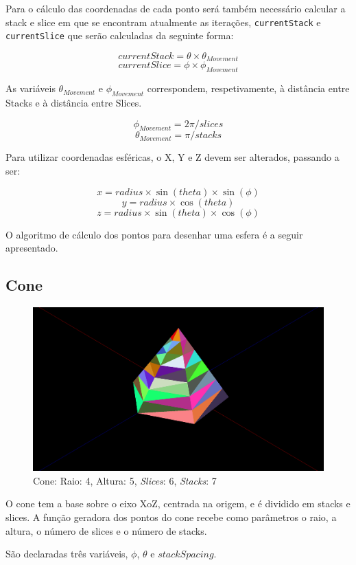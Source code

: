 \documentclass[a4paper]{article}
\newcommand{\x}{\times}
\begin{document}
Para o cálculo das coordenadas de cada ponto será também necessário calcular a stack e slice em que se encontram atualmente as iterações, \texttt{currentStack} e \texttt{currentSlice} que serão calculadas da seguinte forma:

\[currentStack = \theta \x \theta_{Movement}\]
\[currentSlice = \phi \x \phi_{Movement}\]


As variáveis $\theta_{Movement}$ e $\phi_{Movement}$ correspondem, respetivamente, à distância entre Stacks e à distância entre Slices.

\[\phi_{Movement} = 2\pi / slices\]
\[\theta_{Movement} = \pi / stacks\]


Para utilizar coordenadas esféricas, o X, Y e Z devem ser alterados, passando a ser:

\[x = radius \x \sin(theta) \x \sin(\phi)\]
\[y = radius \x \cos(theta)\]
\[z = radius \x \sin(theta) \x \cos(\phi)\]

O algoritmo de cálculo dos pontos para desenhar uma esfera é a seguir apresentado.


\subsection{Cone}

\begin{figure}[H]
    \centering
    \includegraphics[width=\textwidth]{cone.png}
    \caption{Cone: Raio: 4, Altura: 5, \textit{Slices}: 6, \textit{Stacks}: 7}
\end{figure}

O cone tem a base sobre o eixo XoZ, centrada na origem, e é dividido em stacks e slices. A função geradora dos pontos do cone recebe como parâmetros o raio, a altura, o número de slices e o número de stacks.

São declaradas três variáveis, $\phi$, $\theta$ e $stackSpacing$.
\end{document}
